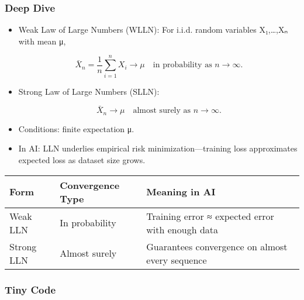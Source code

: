 \documentclass[
  letterpaper,
  DIV=11,
  numbers=noendperiod]{scrreprt}
\begin{document}
\subsubsection{Deep Dive}\label{deep-dive-126}

\begin{itemize}
\item
  Weak Law of Large Numbers (WLLN): For i.i.d. random variables
  X₁,\ldots,Xₙ with mean μ,

  \[
  \bar{X}_n = \frac{1}{n}\sum_{i=1}^n X_i \to μ \quad \text{in probability as } n→∞.
  \]
\item
  Strong Law of Large Numbers (SLLN):

  \[
  \bar{X}_n \to μ \quad \text{almost surely as } n→∞.
  \]
\item
  Conditions: finite expectation μ.
\item
  In AI: LLN underlies empirical risk minimization---training loss
  approximates expected loss as dataset size grows.
\end{itemize}

\begin{longtable}[]{@{}
  >{\raggedright\arraybackslash}p{}
  >{\raggedright\arraybackslash}p{}
  >{\raggedright\arraybackslash}p{}@{}}
\toprule\noalign{}
\begin{minipage}[b]{\linewidth}\raggedright
Form
\end{minipage} & \begin{minipage}[b]{\linewidth}\raggedright
Convergence Type
\end{minipage} & \begin{minipage}[b]{\linewidth}\raggedright
Meaning in AI
\end{minipage} \\
\midrule\noalign{}
\endhead
\bottomrule\noalign{}
\endlastfoot
Weak LLN & In probability & Training error ≈ expected error with enough
data \\
Strong LLN & Almost surely & Guarantees convergence on almost every
sequence \\
\end{longtable}

\subsubsection{Tiny Code}\label{tiny-code-126}
\end{document}
